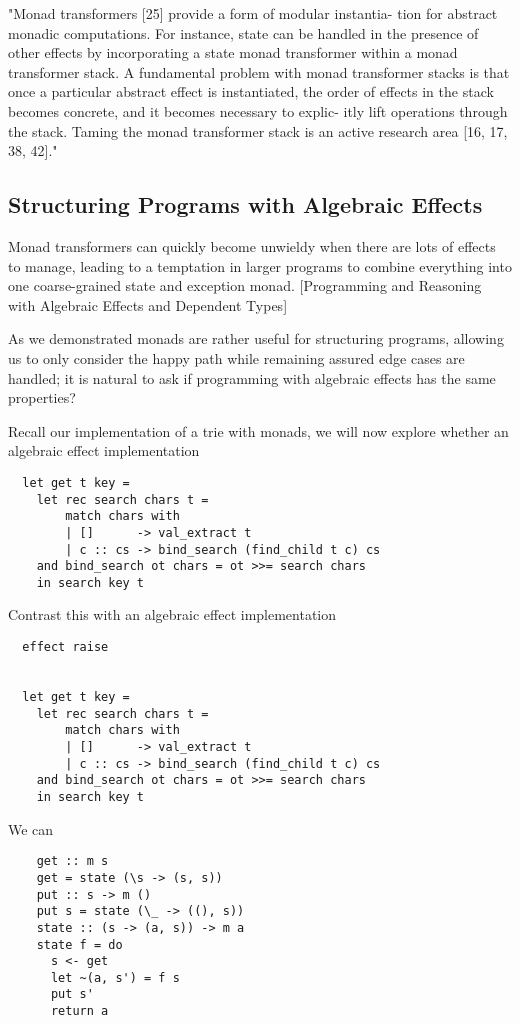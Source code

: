 "Monad transformers [25] provide a form of modular instantia- tion for abstract monadic computations. For instance, state can be handled in the presence of other effects by incorporating a state monad transformer within a monad transformer stack.
A fundamental problem with monad transformer stacks is that once a particular abstract effect is instantiated, the order of effects in the stack becomes concrete, and it becomes necessary to explic- itly lift operations through the stack. Taming the monad transformer stack is an active research area [16, 17, 38, 42]."
\cite{kammar2013handlers}


\subsection{Structuring Programs with Algebraic Effects}
Monad transformers can quickly become unwieldy when there are lots of effects to manage,
leading to a temptation in larger programs to combine everything into one coarse-grained state and exception monad.
[Programming and Reasoning with Algebraic Effects and Dependent Types]

As we demonstrated monads are rather useful for structuring programs,
allowing us to only consider the happy path while remaining assured
edge cases are handled;
it is natural to ask if programming with algebraic effects
has the same properties?

Recall our implementation of a trie with monads,
we will now explore whether an algebraic effect implementation
\begin{verbatim}
  let get t key =
    let rec search chars t =
        match chars with
        | []      -> val_extract t
        | c :: cs -> bind_search (find_child t c) cs
    and bind_search ot chars = ot >>= search chars
    in search key t
\end{verbatim}

Contrast this with an algebraic effect implementation

\begin{verbatim}
  effect raise


  let get t key =
    let rec search chars t =
        match chars with
        | []      -> val_extract t
        | c :: cs -> bind_search (find_child t c) cs
    and bind_search ot chars = ot >>= search chars
    in search key t

\end{verbatim}

We can 

\begin{verbatim}
    get :: m s
    get = state (\s -> (s, s))
    put :: s -> m ()
    put s = state (\_ -> ((), s))
    state :: (s -> (a, s)) -> m a
    state f = do
      s <- get
      let ~(a, s') = f s
      put s'
      return a
\end{verbatim}

